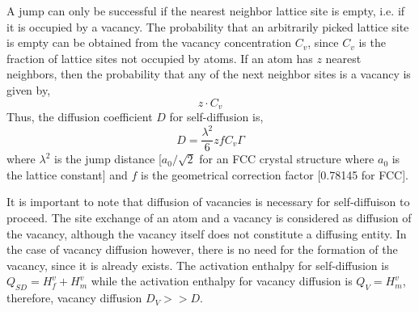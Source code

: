 \documentclass{report}
\begin{document}
A jump can only be successful if the nearest neighbor lattice site is empty, i.e. if it is occupied by a vacancy. The probability that an arbitrarily picked lattice site is empty can be obtained from the vacancy concentration $C_v$, since $C_v$ is the fraction of lattice sites not occupied by atoms. If an atom has $z$ nearest neighbors, then the probability that any of the next neighbor sites is a vacancy is given by, 
%
\begin{equation}
z \cdot C_v
\end{equation}
%
 Thus, the diffusion coefficient $D$ for self-diffusion is,
%
\begin{equation}
D = \dfrac{\lambda^2}{6} z f C_v \Gamma
\end{equation}
%
where $\lambda^2$ is the jump distance [$a_0/\sqrt 2$ for an FCC crystal structure where $a_0$ is the lattice constant] and $f$ is the geometrical correction factor [0.78145 for FCC].

It is important to note that diffusion of vacancies is necessary for self-diffuison to proceed. The site exchange of an atom and a vacancy is considered as diffusion of the vacancy, although the vacancy itself does not constitute a diffusing entity. In the case of vacancy diffusion however, there is no need for the formation of the vacancy, since it is already exists. The activation enthalpy for self-diffusion is $Q_{SD} = H^v_f + H^v_m$ while the activation enthalpy for vacancy diffusion is $Q_{V} =  H^v_m$, therefore, vacancy diffusion $D_V>>D$.
\end{document}
